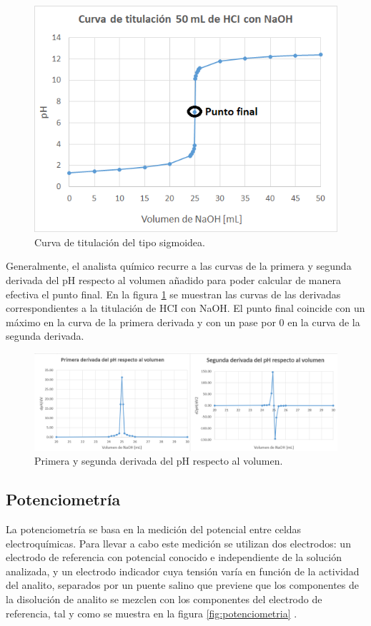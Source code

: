\begin{figure}[htbp]
	\centering
	\includegraphics[width=.7\textwidth]{./Figures/curvaTitulacion1.png}
	\caption{Curva de titulación del tipo sigmoidea.}
	\label{fig:sigmoidea}
\end{figure}

Generalmente, el analista químico recurre a las curvas de la primera y segunda derivada del pH respecto al volumen añadido para poder calcular de manera efectiva el punto final. En la figura \ref{fig:sigmoidea} se muestran las curvas de las derivadas correspondientes a la titulación de HCI con NaOH. El punto final coincide con un máximo en la curva de la primera derivada y con un pase por 0 en la curva de la segunda derivada.

\begin{figure}[htbp]
	\centering
	\includegraphics[width=1.0\textwidth]{./Figures/derivada.png}
	\caption{Primera y segunda derivada del pH respecto al volumen.}
	\label{fig:derivada}
\end{figure}

\subsection{Potenciometría}

La potenciometría se basa en la medición del potencial entre celdas electroquímicas. Para llevar a cabo este medición se utilizan dos electrodos: un electrodo de referencia con potencial conocido e independiente de la solución analizada, y un electrodo indicador cuya tensión varía en función de la actividad del analito,  separados por un puente salino que previene que los componentes de la disolución de analito se mezclen con los componentes del electrodo de referencia, tal y como se muestra en la figura \ref{fig:potenciometria} \citep{BOOK:1}.

